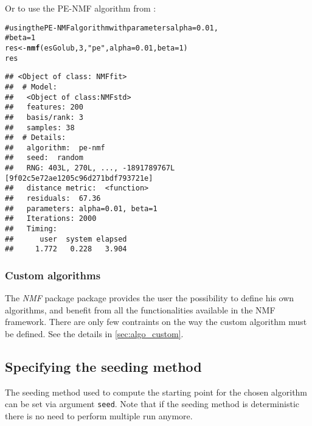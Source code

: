 \documentclass[a4paper]{article}\usepackage{graphicx, color}
\makeatletter
\newcommand{\hlfunctioncall}[1]{\textcolor[rgb]{0.501960784313725,0,0.329411764705882}{\textbf{#1}}}%
\newcommand{\hlstring}[1]{\textcolor[rgb]{0.6,0.6,1}{#1}}%
\newcommand{\hlcomment}[1]{\textcolor[rgb]{0.180392156862745,0.6,0.341176470588235}{#1}}%
\newenvironment{kframe}{%
 \def\at@end@of@kframe{}%
 \ifinner\ifhmode%
  \def\at@end@of@kframe{\end{minipage}}%
  \begin{minipage}{\columnwidth}%
 \fi\fi%
 \def\FrameCommand##1{\hskip\@totalleftmargin \hskip-\fboxsep
 \colorbox{shadecolor}{##1}\hskip-\fboxsep
     \hskip-\linewidth \hskip-\@totalleftmargin \hskip\columnwidth}%
 \MakeFramed {\advance\hsize-\width
   \@totalleftmargin\z@ \linewidth\hsize
   \@setminipage}}%
 {\par\unskip\endMakeFramed%
 \at@end@of@kframe}
\newenvironment{knitrout}{}{} %
\let\code=\texttt
\newcommand{\pkgname}[1]{\textit{#1}\xspace}
\newcommand{\Rpkg}[1]{\pkgname{#1} package\xspace}
\newcommand{\nmfpack}{\Rpkg{NMF}}
\renewcommand{\cite}[1]{\parencite{#1}}
\makeatother
\begin{document}
Or to use the PE-NMF algorithm from \cite{Zhang2008}:
\begin{knitrout}
\color{fgcolor}\begin{kframe}
\begin{alltt}
\hlcomment{# using the PE-NMF algorithm with parameters alpha=0.01,}
\hlcomment{# beta=1}
res <- \hlfunctioncall{nmf}(esGolub, 3, \hlstring{"pe"}, alpha = 0.01, beta = 1)
res
\end{alltt}
\begin{verbatim}
## <Object of class: NMFfit>
##  # Model:
##   <Object of class:NMFstd>
##   features: 200 
##   basis/rank: 3 
##   samples: 38 
##  # Details:
##   algorithm:  pe-nmf 
##   seed:  random 
##   RNG: 403L, 270L, ..., -1891789767L [9f02c5e72ae1205c96d271bdf793721e]
##   distance metric:  <function> 
##   residuals:  67.36 
##   parameters: alpha=0.01, beta=1 
##   Iterations: 2000 
##   Timing:
##      user  system elapsed 
##     1.772   0.228   3.904
\end{verbatim}
\end{kframe}
\end{knitrout}


%
%
%


\subsubsection{Custom algorithms}
The \nmfpack package provides the user the possibility to define his own algorithms, and benefit from all the functionalities available in the NMF framework.
There are only few contraints on the way the custom algorithm must be defined.
See the details in \cref{sec:algo_custom}.

\subsection{Specifying the seeding method}\label{sec:seed}
The seeding method used to compute the starting point for the chosen algorithm can be set via argument \code{seed}. 
Note that if the seeding method is deterministic there is no need to perform multiple run anymore.
\end{document}
